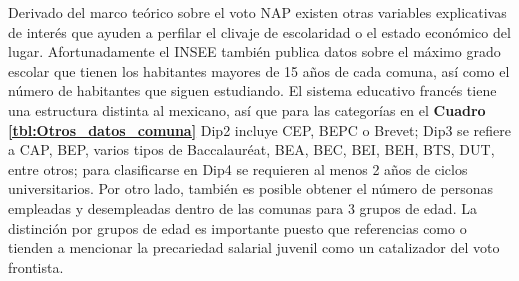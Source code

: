 Derivado del marco teórico sobre el voto NAP existen otras variables explicativas de interés que ayuden a perfilar el clivaje de escolaridad o el estado económico del lugar. Afortunadamente el INSEE también publica datos sobre el máximo grado escolar que tienen los habitantes mayores de 15 años de cada comuna, así como el número de habitantes que siguen estudiando. El sistema educativo francés tiene una estructura distinta al mexicano, así que para las categorías en el \textbf{Cuadro \ref{tbl:Otros_datos_comuna}} Dip2 incluye CEP, BEPC o Brevet; Dip3 se refiere a CAP, BEP, varios tipos de Baccalauréat, BEA, BEC, BEI, BEH, BTS, DUT, entre otros; para clasificarse en Dip4 se requieren al menos 2 años de ciclos universitarios. Por otro lado, también es posible obtener el número de personas empleadas y desempleadas dentro de las comunas para 3 grupos de edad. La distinción por grupos de edad es importante puesto que referencias como \textcite{LeBras16} o \textcite{Perrineau07} tienden a mencionar la precariedad salarial juvenil como un catalizador del voto frontista.\\ 

\begin{table}[h]
\centering
{}
\caption{Otros datos a nivel comuna a utilizar en el análisis.}
\label{tbl:Otros_datos_comuna}
\end{table}

